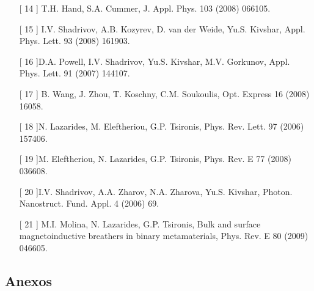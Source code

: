 \documentclass[11pt,letterpaper,twocolumn]{article}
\begin{document}
\begin{itemize}
\item[[ 14]] T.H. Hand, S.A. Cummer, J. Appl. Phys. 103 (2008) 066105.
\item[[ 15]] I.V. Shadrivov, A.B. Kozyrev, D. van der Weide, Yu.S. Kivshar, Appl. Phys. Lett.
93 (2008) 161903.
\item[[ 16]]D.A. Powell, I.V. Shadrivov, Yu.S. Kivshar, M.V. Gorkunov, Appl. Phys. Lett. 91
(2007) 144107.
\item[[ 17]] B. Wang, J. Zhou, T. Koschny, C.M. Soukoulis, Opt. Express 16 (2008)
16058.
\item[[ 18]]N. Lazarides, M. Eleftheriou, G.P. Tsironis, Phys. Rev. Lett. 97 (2006) 157406.
\item[[ 19]]M. Eleftheriou, N. Lazarides, G.P. Tsironis, Phys. Rev. E 77 (2008) 036608.
\item[[ 20]]I.V. Shadrivov, A.A. Zharov, N.A. Zharova, Yu.S. Kivshar, Photon. Nanostruct.
Fund. Appl. 4 (2006) 69.

\item[[ 21]] M.I. Molina, N. Lazarides, G.P. Tsironis, Bulk and surface magnetoinductive
breathers in binary metamaterials, Phys. Rev. E 80 (2009) 046605.
\end{itemize}
\subsection*{Anexos}
\end{document}
